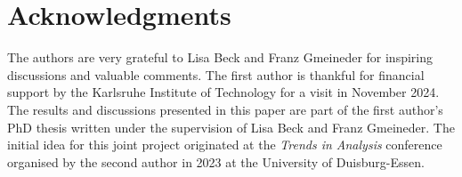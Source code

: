 \documentclass[a4paper,10pt,reqno,oneside]{amsart}
\numberwithin{equation}{section}
\begin{document}
\section*{Acknowledgments}
The authors are very grateful to Lisa Beck and Franz Gmeineder for inspiring discussions and valuable comments. The first author is thankful for financial support by the Karlsruhe Institute of Technology for a visit in November 2024. The results and discussions presented in this paper are part of the first author’s PhD thesis written under the supervision of Lisa Beck and Franz Gmeineder. The initial idea for this joint project originated at the \textit{Trends in Analysis} conference organised by the second author in 2023 at the University of Duisburg-Essen.
\end{document}

